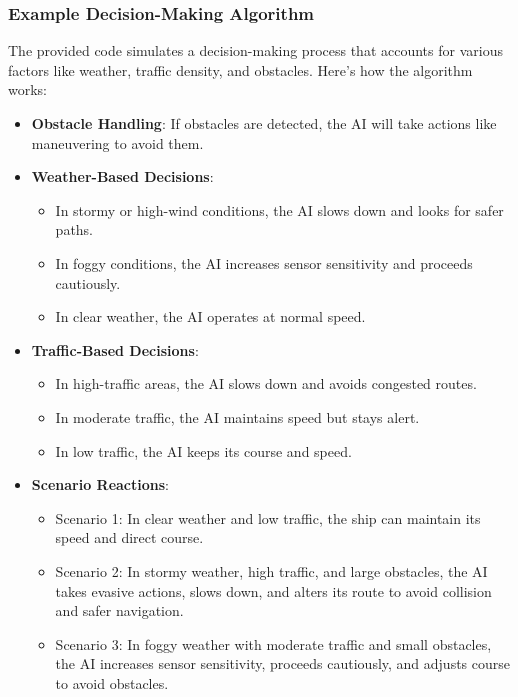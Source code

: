 \documentclass{article}
\begin{document}
\subsubsection{Example Decision-Making Algorithm}

The provided code simulates a decision-making process that accounts for various factors like weather, traffic density, and obstacles. Here's how the algorithm works:

\begin{itemize}
    \item \textbf{Obstacle Handling}: If obstacles are detected, the AI will take actions like maneuvering to avoid them.
    \item \textbf{Weather-Based Decisions}:
    \begin{itemize}
        \item In stormy or high-wind conditions, the AI slows down and looks for safer paths.
        \item In foggy conditions, the AI increases sensor sensitivity and proceeds cautiously.
        \item In clear weather, the AI operates at normal speed.
    \end{itemize}
    \item \textbf{Traffic-Based Decisions}:
    \begin{itemize}
        \item In high-traffic areas, the AI slows down and avoids congested routes.
        \item In moderate traffic, the AI maintains speed but stays alert.
        \item In low traffic, the AI keeps its course and speed.
    \end{itemize}
    \item \textbf{Scenario Reactions}:
    \begin{itemize}
        \item Scenario 1: In clear weather and low traffic, the ship can maintain its speed and direct course.
        \item Scenario 2: In stormy weather, high traffic, and large obstacles, the AI takes evasive actions, slows down, and alters its route to avoid collision and safer navigation.
        \item Scenario 3: In foggy weather with moderate traffic and small obstacles, the AI increases sensor sensitivity, proceeds cautiously, and adjusts course to avoid obstacles.
    \end{itemize}
\end{itemize}
\end{document}
